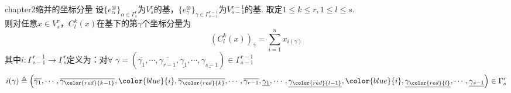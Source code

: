 \begin{mythm}{}{chapter2缩并的坐标分量}
	设$\{ e^{\otimes}_{\alpha}\}_{\alpha\in \Gamma^{r}_{s}}$为$V^{r}_{s}$的基，$\{ e^{\otimes}_{\gamma}\}_{\gamma\in \Gamma^{r-1}_{s-1}}$为$V^{r-1}_{s-1}$的基. 取定$1\leqslant k\leqslant r,1\leqslant l\leqslant s$. \\
	则对任意$x\in V^{r}_{s}$，$C^{k}_{l}(x)$在基下的第$\gamma$个坐标分量为
	\[
	 \left(C^{k}_{l}(x)\right)_{\gamma}=\sum_{ i = 1 }^{n}x_{i(\gamma)}
	\]
	其中$i:\Gamma^{r-1}_{s-1}\longrightarrow \Gamma^{r}_{s}$定义为：对$\forall\; \gamma=(\overline{\gamma_{1}},\cdots,\overline{\gamma_{r-1}},\underline{\gamma_{1}},\cdots,\underline{\gamma_{s-1}})\in \Gamma^{r-1}_{s-1}$
	\[
	i(\gamma)\triangleq \left(\overline{\gamma_{1}},\cdots,\overline{\gamma_{\color{red}{k-1}}},{\color{blue}{i}},\overline{\gamma_{\color{red}{k}}},\cdots,\overline{\gamma_{r-1}},\underline{\gamma_{1}},\cdots,\underline{\gamma_{\color{red}{l-1}}},{\color{blue}{i}},\underline{\gamma_{\color{red}{l}}},\cdots,\underline{\gamma_{s-1}}\right)\in \Gamma^{r}_{s}
	\]
\end{mythm}
